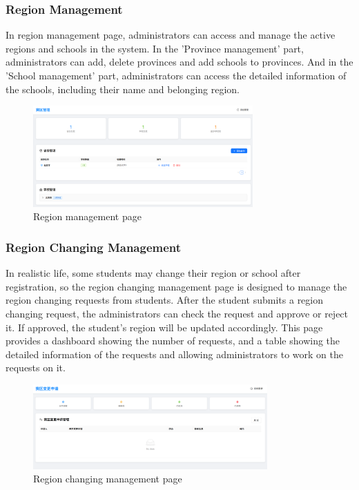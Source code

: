 \documentclass[12pt]{article}
\begin{document}
\subsubsection{Region Management}
In region management page, administrators can access and manage the active regions and schools in the system. In the 'Province management'
part, administrators can add, delete provinces and add schools to provinces. And in the 'School management' part, administrators can
access the detailed information of the schools, including their name and belonging region.
\begin{figure}[H]
    \centering
    \includegraphics[width=0.75\textwidth]{admin/region-overview.png}
    \caption{Region management page}
    \label{fig:RegionManagement page}
\end{figure}
\subsubsection{Region Changing Management}
In realistic life, some students may change their region or school after registration, so the region changing management page is designed to
manage the region changing requests from students. After the student submits a region changing request,
the administrators can check the request and approve or reject it. If approved, the student's region will be updated accordingly.
This page provides a dashboard showing the number of requests, and a table showing the detailed information of the requests
and allowing administrators to work on the requests on it.
\begin{figure}[H]
    \centering
    \includegraphics[width=0.8\textwidth]{admin/changeregion.png}
    \caption{Region changing management page}
    \label{fig:RegionChangingManagement page}
\end{figure}
\end{document}
